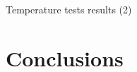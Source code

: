 \documentclass[compress,red]{beamer}
\begin{document}
\begin{frame}{Temperature tests results (2)}

\end{frame}
\section{Conclusions}
\end{document}
